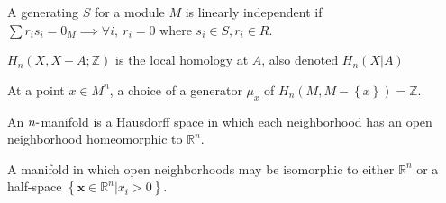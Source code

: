 \begin{definition}

A generating \(S\) for a module \(M\) is linearly independent if
\(\sum r_{i} s_{i} = 0_M \implies \forall i,~r_{i} = 0\) where
\(s_{i}\in S, r_{i} \in R\).

\end{definition}

\begin{definition}

\(H_{n}(X, X-A; {\mathbb{Z}})\) is the local homology at \(A\), also
denoted \(H_{n}(X \mathrel{\Big|}A)\)

\end{definition}

\begin{definition}

At a point \(x\in M^n\), a choice of a generator \(\mu_{x}\) of
\(H_{n}(M, M - \left\{{x}\right\}) = {\mathbb{Z}}\).

\end{definition}

\begin{definition}

\end{definition}


\begin{definition}

\end{definition}


\begin{definition}[Manifold]

An \(n{\hbox{-}}\)manifold is a Hausdorff space in which each
neighborhood has an open neighborhood homeomorphic to
\({\mathbb{R}}^n\).

\end{definition}

\begin{definition}

A manifold in which open neighborhoods may be isomorphic to either
\({\mathbb{R}}^n\) or a half-space
\(\left\{{\mathbf{x} \in {\mathbb{R}}^n \mathrel{\Big|}x_{i} > 0}\right\}\).

\end{definition}

\begin{definition}

\end{definition}

